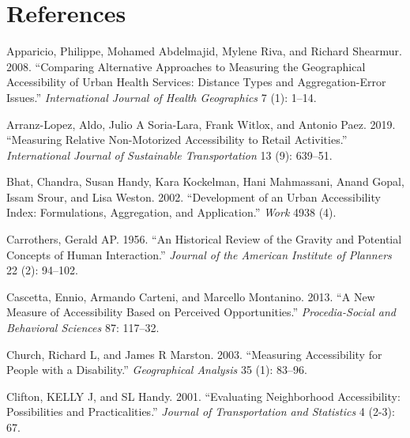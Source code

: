 \documentclass[preprint, 3p,
authoryear]{elsarticle} %
\newlength{\cslhangindent}
\newlength{\cslentryspacingunit} %
\newenvironment{CSLReferences}[2] %
 {%
  \setlength{\parindent}{0pt}
  \ifodd #1
  \let\oldpar\par
  \def\par{\hangindent=\cslhangindent\oldpar}
  \fi
  \setlength{\parskip}{#2\cslentryspacingunit}
 }%
 {}
\begin{document}
\hypertarget{references}{%
\section*{References}\label{references}}

\hypertarget{refs}{}
\begin{CSLReferences}{1}{0}
\leavevmode{}%
Apparicio, Philippe, Mohamed Abdelmajid, Mylene Riva, and Richard
Shearmur. 2008. {``Comparing Alternative Approaches to Measuring the
Geographical Accessibility of Urban Health Services: Distance Types and
Aggregation-Error Issues.''} \emph{International Journal of Health
Geographics} 7 (1): 1--14.

\leavevmode{}%
Arranz-Lopez, Aldo, Julio A Soria-Lara, Frank Witlox, and Antonio Paez.
2019. {``Measuring Relative Non-Motorized Accessibility to Retail
Activities.''} \emph{International Journal of Sustainable
Transportation} 13 (9): 639--51.

\leavevmode{}%
Bhat, Chandra, Susan Handy, Kara Kockelman, Hani Mahmassani, Anand
Gopal, Issam Srour, and Lisa Weston. 2002. {``Development of an Urban
Accessibility Index: Formulations, Aggregation, and Application.''}
\emph{Work} 4938 (4).

\leavevmode{}%
Carrothers, Gerald AP. 1956. {``An Historical Review of the Gravity and
Potential Concepts of Human Interaction.''} \emph{Journal of the
American Institute of Planners} 22 (2): 94--102.

\leavevmode{}%
Cascetta, Ennio, Armando Carteni, and Marcello Montanino. 2013. {``A New
Measure of Accessibility Based on Perceived Opportunities.''}
\emph{Procedia-Social and Behavioral Sciences} 87: 117--32.

\leavevmode{}%
Church, Richard L, and James R Marston. 2003. {``Measuring Accessibility
for People with a Disability.''} \emph{Geographical Analysis} 35 (1):
83--96.

\leavevmode{}%
Clifton, KELLY J, and SL Handy. 2001. {``Evaluating Neighborhood
Accessibility: Possibilities and Practicalities.''} \emph{Journal of
Transportation and Statistics} 4 (2-3): 67.


\end{CSLReferences}
\end{document}
